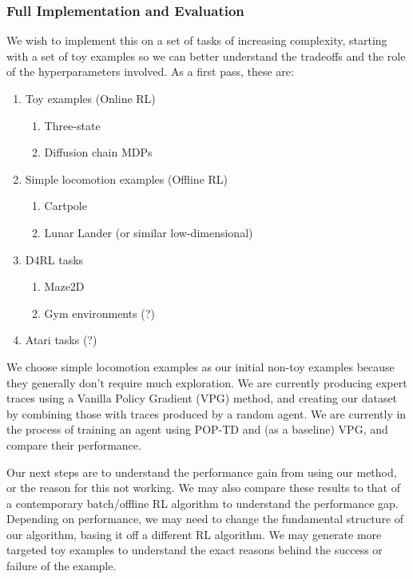 \documentclass[11pt]{article}
\begin{document}
\subsubsection{Full Implementation and Evaluation }

We wish to implement this on a set of tasks of increasing complexity, starting with a set of toy examples so we can better understand the tradeoffs and the role of the hyperparameters involved. As a first pass, these are:
\begin{enumerate}
  \item Toy examples (Online RL)
  \begin{enumerate}
    \item Three-state
    \item Diffusion chain MDPs
  \end{enumerate}

  \item Simple locomotion examples (Offline RL)
  \begin{enumerate}
    \item Cartpole
    \item Lunar Lander (or similar low-dimensional)
  \end{enumerate}

  \item D4RL tasks
  \begin{enumerate}
    \item Maze2D
    \item Gym environments (?)
  \end{enumerate}

  \item Atari tasks (?)
\end{enumerate}

We choose simple locomotion examples as our initial non-toy examples because they generally don't require much exploration. We are currently producing expert traces using a Vanilla Policy Gradient (VPG) method, and creating our dataset by combining those with traces produced by a random agent. We are currently in the process of training an agent using POP-TD and (as a baseline) VPG, and compare their performance.

Our next steps are to understand the performance gain from using our method, or the reason for this not working. We may also compare these results to that of a contemporary batch/offline RL algorithm to understand the performance gap. Depending on performance, we may need to change the fundamental structure of our algorithm, basing it off a different RL algorithm. We may generate more targeted toy examples to understand the exact reasons behind the success or failure of the example.
\end{document}
